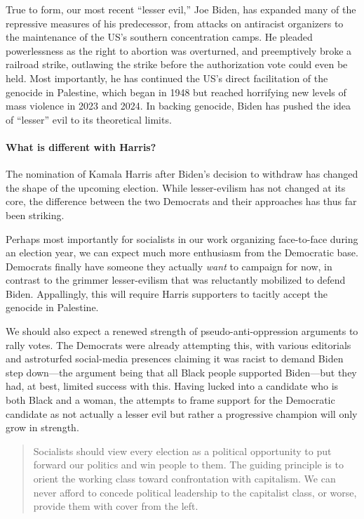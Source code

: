 True to form, our most recent ``lesser evil,'' Joe Biden, has expanded many of the repressive measures of his predecessor, from attacks on antiracist organizers to the maintenance of the US's southern concentration camps. He pleaded powerlessness as the right to abortion was overturned, and preemptively broke a railroad strike, outlawing the strike before the authorization vote could even be held. Most importantly, he has continued the US's direct facilitation of the genocide in Palestine, which began in 1948 but reached horrifying new levels of mass violence in 2023 and 2024. In backing genocide, Biden has pushed the idea of ``lesser'' evil to its theoretical limits.

\paragraph{What is different with Harris?}

The nomination of Kamala Harris after Biden's decision to withdraw has changed the shape of the upcoming election. While lesser-evilism has not changed at its core, the difference between the two Democrats and their approaches has thus far been striking.

Perhaps most importantly for socialists in our work organizing face-to-face during an election year, we can expect much more enthusiasm from the Democratic base. Democrats finally have someone they actually \emph{want} to campaign for now, in contrast to the grimmer lesser-evilism that was reluctantly mobilized to defend Biden. Appallingly, this will require Harris supporters to tacitly accept the genocide in Palestine.

We should also expect a renewed strength of pseudo-anti-oppression arguments to rally votes. The Democrats were already attempting this, with various editorials and astroturfed social-media presences claiming it was racist to demand Biden step down---the argument being that all Black people supported Biden---but they had, at best, limited success with this. Having lucked into a candidate who is both Black and a woman, the attempts to frame support for the Democratic candidate as not actually a lesser evil but rather a progressive champion will only grow in strength.

\blockquote{Socialists should view every election as a political opportunity to put forward our politics and win people to them. The guiding principle is to orient the working class toward confrontation with capitalism. We can never afford to concede political leadership to the capitalist class, or worse, provide them with cover from the left.}

